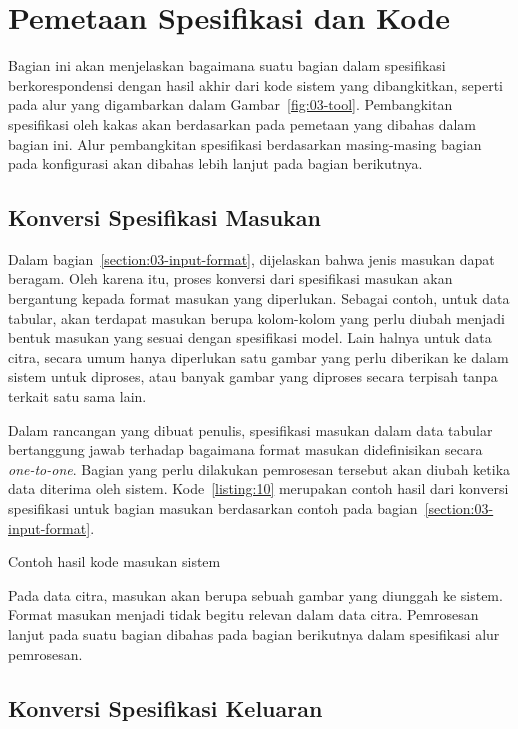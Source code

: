 \section{Pemetaan Spesifikasi dan Kode}

Bagian ini akan menjelaskan bagaimana suatu bagian dalam spesifikasi berkorespondensi dengan hasil akhir dari kode sistem yang dibangkitkan, seperti pada alur yang digambarkan dalam Gambar~\ref{fig:03-tool}.
Pembangkitan spesifikasi oleh kakas akan berdasarkan pada pemetaan yang dibahas dalam bagian ini.
Alur pembangkitan spesifikasi berdasarkan masing-masing bagian pada konfigurasi akan dibahas lebih lanjut pada bagian berikutnya.

\subsection{Konversi Spesifikasi Masukan}

Dalam bagian~\ref{section:03-input-format}, dijelaskan bahwa jenis masukan dapat beragam.
Oleh karena itu, proses konversi dari spesifikasi masukan akan bergantung kepada format masukan yang diperlukan.
Sebagai contoh, untuk data tabular, akan terdapat masukan berupa kolom-kolom yang perlu diubah menjadi bentuk masukan yang sesuai dengan spesifikasi model.
Lain halnya untuk data citra, secara umum hanya diperlukan satu gambar yang perlu diberikan ke dalam sistem untuk diproses, atau banyak gambar yang diproses secara terpisah tanpa terkait satu sama lain.

Dalam rancangan yang dibuat penulis, spesifikasi masukan dalam data tabular bertanggung jawab terhadap bagaimana format masukan didefinisikan secara \textit{one-to-one}.
Bagian yang perlu dilakukan pemrosesan tersebut akan diubah ketika data diterima oleh sistem.
Kode~\ref{listing:10} merupakan contoh hasil dari konversi spesifikasi untuk bagian masukan berdasarkan contoh pada bagian~\ref{section:03-input-format}.

\begin{code}
	\caption{Contoh hasil kode masukan sistem}\label{listing:10}
\end{code}

Pada data citra, masukan akan berupa sebuah gambar yang diunggah ke sistem.
Format masukan menjadi tidak begitu relevan dalam data citra.
Pemrosesan lanjut pada suatu bagian dibahas pada bagian berikutnya dalam spesifikasi alur pemrosesan. 

\subsection{Konversi Spesifikasi Keluaran}

